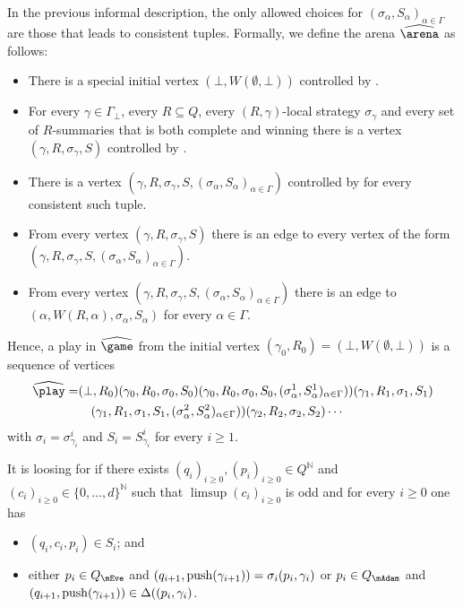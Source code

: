 In the previous informal description, the only allowed choices for $(\sigma_\alpha,S_\alpha)_{\alpha\in\Gamma}$ are those that leads to consistent tuples.
Formally, we define the arena $\harena$ as follows:
\begin{itemize}
	\item There is a special initial vertex $(\bot,W(\emptyset,\bot))$ controlled by \Eve.
	\item For every $\gamma\in \Gamma_\bot$, every $R\subseteq Q$, every $(R,\gamma)$-local strategy $\sigma_\gamma$ and every set of $R$-summaries that is both complete and winning there is a vertex $(\gamma,R,\sigma_\gamma,S)$ controlled by \Eve.
	\item There is a vertex $(\gamma,R,\sigma_\gamma,S,(\sigma_\alpha,S_\alpha)_{\alpha\in\Gamma})$ controlled by \Adam  for every consistent such tuple.
	\item From every vertex $(\gamma,R,\sigma_\gamma,S)$ there is an edge to every vertex of the form $(\gamma,R,\sigma_\gamma,S,(\sigma_\alpha,S_\alpha)_{\alpha\in\Gamma})$.
	\item From every vertex $(\gamma,R,\sigma_\gamma,S,(\sigma_\alpha,S_\alpha)_{\alpha\in\Gamma})$ there is an edge to $(\alpha,W(R,\alpha),\sigma_\alpha,S_\alpha)$ for every $\alpha\in\Gamma$.
\end{itemize}


Hence, a play in $\hgame$ from the initial vertex $(\gamma_0,R_0)=(\bot,W(\emptyset,\bot))$ is a sequence of vertices 
\begin{equation*}
\begin{split}
\hplay = & (\bot,R_0)(\gamma_0,R_0,\sigma_0,S_0)(\gamma_0,R_0,\sigma_0,S_0,(\sigma^1_\alpha,S^1_\alpha)_{\alpha\in\Gamma}))(\gamma_1,R_1,\sigma_1,S_1)\\ &\quad (\gamma_1,R_1,\sigma_1,S_1,(\sigma^2_\alpha,S^2_\alpha)_{\alpha\in\Gamma}))(\gamma_2,R_2,\sigma_2,S_2)\cdots	
\end{split}
\end{equation*}
with $\sigma_i=\sigma_{\gamma_i}^i$ and $S_i=S_{\gamma_i}^i$ for every $i\geq 1$.
	
It is loosing for \Eve if there exists $(q_i)_{i\geq 0},(p_i)_{i\geq 0}\in Q^{\mathbb{N}}$ and $(c_i)_{i\geq 0}\in \{0,\dots,d\}^{\mathbb{N}}$ such that $\limsup(c_i)_{i\geq 0}$ is odd and for every $i\geq 0$ one has
\begin{itemize}
	\item $(q_i,c_i,p_i)\in S_i$; and 
	\item either $p_i\in Q_\mEve$ and $(q_{i+1},\mathrm{push}(\gamma_{i+1}))=\sigma_i(p_i,\gamma_i)$ or $p_i\in Q_\mAdam$ and $(q_{i+1},\mathrm{push}(\gamma_{i+1}))\in \Delta((p_i,\gamma_i)$.
\end{itemize}


